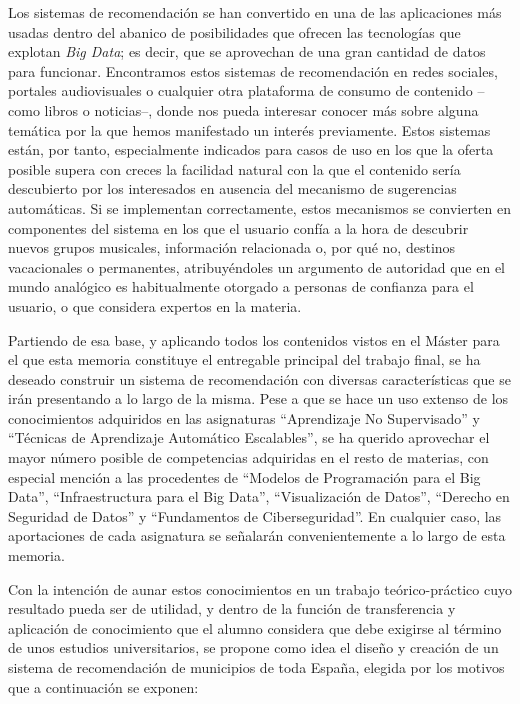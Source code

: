 
Los sistemas de recomendación se han convertido en una de las aplicaciones más usadas dentro del abanico de posibilidades que ofrecen las tecnologías que explotan \textit{Big Data}; es decir, que se aprovechan de una gran cantidad de datos para funcionar. Encontramos estos sistemas de recomendación en redes sociales, portales audiovisuales o cualquier otra plataforma de consumo de contenido –como libros o noticias–, donde nos pueda interesar conocer más sobre alguna temática por la que hemos manifestado un interés previamente. Estos sistemas están, por tanto, especialmente indicados para casos de uso en los que la oferta posible supera con creces la facilidad natural con la que el contenido sería descubierto por los interesados en ausencia del mecanismo de sugerencias automáticas. Si se implementan correctamente, estos mecanismos se convierten en componentes del sistema en los que el usuario confía a la hora de descubrir nuevos grupos musicales, información relacionada o, por qué no, destinos vacacionales o permanentes, atribuyéndoles un argumento de autoridad que en el mundo analógico es habitualmente otorgado a personas de confianza para el usuario, o que considera expertos en la materia.

Partiendo de esa base, y aplicando todos los contenidos vistos en el Máster para el que esta memoria constituye el entregable principal del trabajo final, se ha deseado construir un sistema de recomendación con diversas características que se irán presentando a lo largo de la misma. Pese a que se hace un uso extenso de los conocimientos adquiridos en las asignaturas ``Aprendizaje No Supervisado'' y ``Técnicas de Aprendizaje Automático Escalables'', se ha querido aprovechar el mayor número posible de competencias adquiridas en el resto de materias, con especial mención a las procedentes de ``Modelos de Programación para el Big Data'', ``Infraestructura para el Big Data'', ``Visualización de Datos'', ``Derecho en Seguridad de Datos'' y ``Fundamentos de Ciberseguridad''. En cualquier caso, las aportaciones de cada asignatura se señalarán convenientemente a lo largo de esta memoria.

Con la intención de aunar estos conocimientos en un trabajo teórico-práctico cuyo resultado pueda ser de utilidad, y dentro de la función de transferencia y aplicación de conocimiento que el alumno considera que debe exigirse al término de unos estudios universitarios, se propone como idea el diseño y creación de un sistema de recomendación de municipios de toda España, elegida por los motivos que a continuación se exponen:

